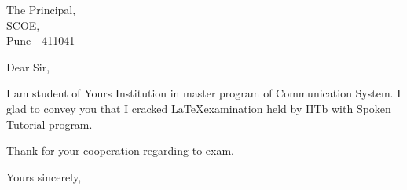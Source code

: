 \documentclass[12pt]{letter}
\date{\today}
\begin{document}
  \begin{letter}
  {The Principal,\\ SCOE,\\ Pune - 411041}

  \opening{Dear Sir,}
  I am student of Yours Institution in master program of Communication System. I glad to convey you that I cracked \LaTeX examination held by IITb with Spoken Tutorial
  program.
  \newline
  
  Thank for your cooperation regarding to exam.
  
\closing{Yours sincerely,}
\end{letter}
\end{document}
